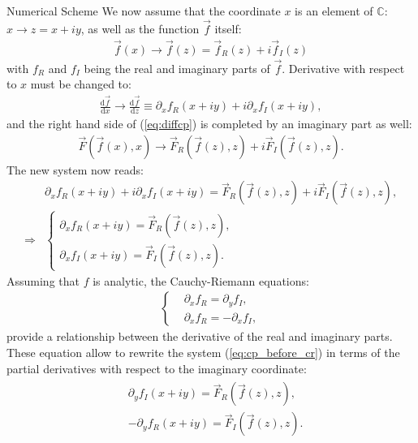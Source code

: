 \begin{section}{Numerical Scheme}
  We now assume that the coordinate $x$ is an element of $\mathbb{C}$:
  $x\to z=x+iy$, as well as the function $\vec f$ itself:
  \begin{align}
    \vec f(x)\to \vec f(z)=\vec f_{R}(z)+i\vec f_{I}(z)
  \end{align}
  with $f_{R}$ and $f_{I}$ being the real and imaginary parts of $\vec
  f$. Derivative with respect to $x$ must be changed to:
  \begin{align}
    \frac{\mathrm{d}\vec f}{\mathrm d x} \to \frac{\mathrm{d}\vec f}{\mathrm d z} \equiv \partial_x f_R(x+iy)+i\partial_x f_I(x+iy),
  \end{align}
  and the right hand side of (\ref{eq:diffcp}) is completed by an imaginary part as well:
  \begin{align}
    \vec F(\vec f(x),x) \to \vec F_R(\vec f(z),z)+i\vec F_I(\vec f(z),z).
  \end{align}
  The new system now reads:
  \begin{align}
    &\partial_x f_R(x+iy)+i\partial_x f_I(x+iy) = \vec F_R(\vec f(z),z)+i\vec F_I(\vec f(z),z),\\
    \Rightarrow &\left\{
    \begin{aligned}
      \partial_x f_R(x+iy) = \vec F_R(\vec f(z),z),\\
      \partial_x f_I(x+iy) = \vec F_I(\vec f(z),z).
    \end{aligned}
    \right.\label{eq:cp_before_cr}
  \end{align}
  Assuming that $f$ is analytic, the Cauchy-Riemann equations:
  \begin{align}\label{eq:cr}
    \left\{
    \begin{aligned}
      &\partial_x f_{R} = \partial_{y} f_{I},\\
      &\partial_x f_{R} = -\partial_{x} f_{I},
    \end{aligned}
    \right.
  \end{align}
  provide a relationship between the derivative of the real and
  imaginary parts.  These equation allow to rewrite the system
  (\ref{eq:cp_before_cr}) in terms of the partial derivatives with
  respect to the imaginary coordinate:
  \begin{align}
    \begin{aligned}
      &\partial_y f_I(x+iy) = \vec F_R(\vec f(z),z),\\
      &-\partial_y f_R(x+iy) = \vec F_I(\vec f(z),z).
    \end{aligned}\label{eq:cp}
  \end{align}


\end{section}
